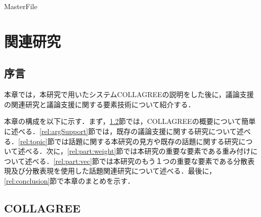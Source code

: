 \expandafter\ifx\csname MasterFile\endcsname\relax
	\def\SubFile{hoge}
	
	
	\setcounter{chapter}{1}
  \fi
  \cleardoublepage
\chapter{関連研究}
\label{relwork:chapter}

\section{序言}
\label{relwork:introduction}
本章では，本研究で用いたシステムCOLLAGREEの説明をした後に，議論支援の関連研究と議論支援に関する要素技術について紹介する．


本章の構成を以下に示す．まず，\ref{rel:collagree}節では，COLLAGREEの概要について簡単に述べる．\ref{rel:argSupport}節では，既存の議論支援に関する研究について述べる．\ref{rel:topic}節では話題に関する本研究の見方や既存の話題に関する研究について述べる．次に，\ref{rel:part:weight}節では本研究の重要な要素である重み付けについて述べる．\ref{rel:part:vec}節では本研究のもう１つの重要な要素である分散表現及び分散表現を使用した話題関連研究について述べる．最後に，\ref{rel:conclusion}節で本章のまとめを示す．

\clearpage
\section{COLLAGREE}
\label{rel:collagree}

